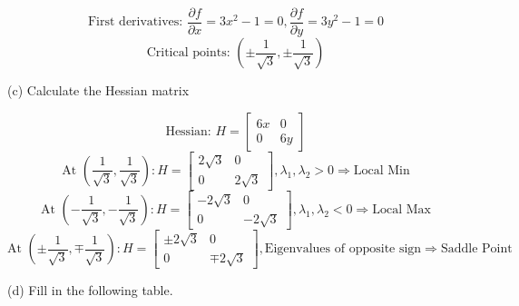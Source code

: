 \documentclass{article} %
\begin{document}
{    \[ \text{First derivatives: }
    \frac{\partial f}{\partial x} = 3x^2 - 1=0, 
    \frac{\partial f}{\partial y} = 3y^2 - 1=0 \]
    \[ \text{Critical points: }
    \left( \pm \frac{1}{\sqrt{3}}, \pm \frac{1}{\sqrt{3}} \right) \]

    \noindent (c) Calculate the Hessian matrix

    \[ \text{Hessian: }
    H = \begin{bmatrix}
    6x & 0 \\
    0 & 6y
    \end{bmatrix} \]
    \[ \text{At } \left( \frac{1}{\sqrt{3}}, \frac{1}{\sqrt{3}} \right):
    H = \begin{bmatrix} 2\sqrt{3} & 0 \\ 0 & 2\sqrt{3} \end{bmatrix}, \lambda_1,\lambda_2 > 0 \Rightarrow \text{Local Min} \]
    \[ \text{At } \left( -\frac{1}{\sqrt{3}}, -\frac{1}{\sqrt{3}} \right):
    H = \begin{bmatrix} -2\sqrt{3} & 0 \\ 0 & -2\sqrt{3} \end{bmatrix}, \lambda_1,\lambda_2 < 0 \Rightarrow \text{Local Max} \]
    \[ \text{At } \left( \pm \frac{1}{\sqrt{3}}, \mp \frac{1}{\sqrt{3}} \right): 
    H = \begin{bmatrix} \pm 2\sqrt{3} & 0 \\ 0 & \mp 2\sqrt{3} \end{bmatrix}, \text{Eigenvalues of opposite sign} \Rightarrow \text{Saddle Point} \]

    \noindent (d) Fill in the following table. \\

}
\end{document}
